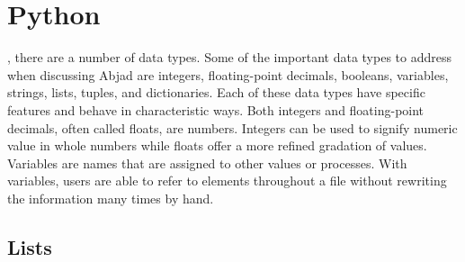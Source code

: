 		\section{Python}

, there are a number of data types. Some of the important data types to address when discussing Abjad are integers, floating-point decimals, booleans, variables, strings, lists, tuples, and dictionaries. Each of these data types have specific features and behave in characteristic ways. Both integers and floating-point decimals, often called floats, are numbers. Integers can be used to signify numeric value in whole numbers while floats offer a more refined gradation of values. Variables are names that are assigned to other values or processes. With variables, users are able to refer to elements throughout a file without rewriting the information many times by hand.
    \subsection{Lists}
